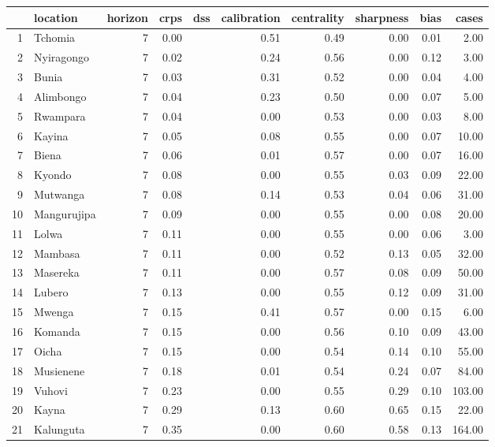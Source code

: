 \begin{table}[ht]
\centering
\begin{tabular}{rlrrrrrrrr}
  \hline
 & location & horizon & crps & dss & calibration & centrality & sharpness & bias & cases \\ 
  \hline
1 & Tchomia &   7 & 0.00 &  & 0.51 & 0.49 & 0.00 & 0.01 & 2.00 \\ 
  2 & Nyiragongo &   7 & 0.02 &  & 0.24 & 0.56 & 0.00 & 0.12 & 3.00 \\ 
  3 & Bunia &   7 & 0.03 &  & 0.31 & 0.52 & 0.00 & 0.04 & 4.00 \\ 
  4 & Alimbongo &   7 & 0.04 &  & 0.23 & 0.50 & 0.00 & 0.07 & 5.00 \\ 
  5 & Rwampara &   7 & 0.04 &  & 0.00 & 0.53 & 0.00 & 0.03 & 8.00 \\ 
  6 & Kayina &   7 & 0.05 &  & 0.08 & 0.55 & 0.00 & 0.07 & 10.00 \\ 
  7 & Biena &   7 & 0.06 &  & 0.01 & 0.57 & 0.00 & 0.07 & 16.00 \\ 
  8 & Kyondo &   7 & 0.08 &  & 0.00 & 0.55 & 0.03 & 0.09 & 22.00 \\ 
  9 & Mutwanga &   7 & 0.08 &  & 0.14 & 0.53 & 0.04 & 0.06 & 31.00 \\ 
  10 & Mangurujipa &   7 & 0.09 &  & 0.00 & 0.55 & 0.00 & 0.08 & 20.00 \\ 
  11 & Lolwa &   7 & 0.11 &  & 0.00 & 0.55 & 0.00 & 0.06 & 3.00 \\ 
  12 & Mambasa &   7 & 0.11 &  & 0.00 & 0.52 & 0.13 & 0.05 & 32.00 \\ 
  13 & Masereka &   7 & 0.11 &  & 0.00 & 0.57 & 0.08 & 0.09 & 50.00 \\ 
  14 & Lubero &   7 & 0.13 &  & 0.00 & 0.55 & 0.12 & 0.09 & 31.00 \\ 
  15 & Mwenga &   7 & 0.15 &  & 0.41 & 0.57 & 0.00 & 0.15 & 6.00 \\ 
  16 & Komanda &   7 & 0.15 &  & 0.00 & 0.56 & 0.10 & 0.09 & 43.00 \\ 
  17 & Oicha &   7 & 0.15 &  & 0.00 & 0.54 & 0.14 & 0.10 & 55.00 \\ 
  18 & Musienene &   7 & 0.18 &  & 0.01 & 0.54 & 0.24 & 0.07 & 84.00 \\ 
  19 & Vuhovi &   7 & 0.23 &  & 0.00 & 0.55 & 0.29 & 0.10 & 103.00 \\ 
  20 & Kayna &   7 & 0.29 &  & 0.13 & 0.60 & 0.65 & 0.15 & 22.00 \\ 
  21 & Kalunguta &   7 & 0.35 &  & 0.00 & 0.60 & 0.58 & 0.13 & 164.00 \\ 

\end{tabular}
\end{table}
